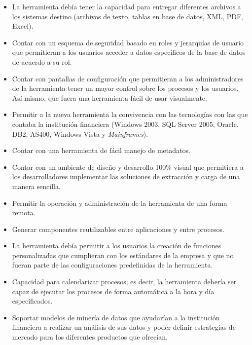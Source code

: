 \begin{itemize}
\item La herramienta debía tener la capacidad para entregar diferentes archivos
  a los sistemas destino (archivos de texto, tablas en base de datos, XML, PDF,
  Excel).

\item Contar con un esquema de seguridad basado en roles y jerarquías de usuario
  que permitieran a los usuarios acceder a datos específicos de la base de datos
  de acuerdo a su rol.

\item Contar con pantallas de configuración que permitieran a los
  administradores de la herramienta tener un mayor control sobre los procesos y
  los usuarios. Así mismo, que fuera una herramienta fácil de usar visualmente.

\item Permitir a la nueva herramienta la convivencia con las tecnologías con las
  que contaba la institución financiera (Windows 2003, SQL Server 2005, Oracle,
  DB2, AS400, Windows Vista y \emph{Mainframes}).

\item Contar con una herramienta de fácil manejo de metadatos.

\item Contar con un ambiente de diseño y desarrollo 100\% visual que permitiera
  a los desarrolladores implementar las soluciones de extracción y carga de una
  manera sencilla.

\item Permitir la operación y administración de la herramienta de una forma
  remota.

\item Generar componentes reutilizables entre aplicaciones y entre procesos.

\item La herramienta debía permitir a los usuarios la creación de funciones
  personalizadas que cumplieran con los estándares de la empresa y que no fueran
  parte de las configuraciones predefinidas de la herramienta.

\item Capacidad para calendarizar procesos; es decir, la herramienta debería ser
  capaz de ejecutar los procesos de forma automática a la hora y día
  especificados.

\item Soportar modelos de minería de datos que ayudarían a la institución
  financiera a realizar un análisis de sus datos y poder definir estrategias de
  mercado para los diferentes productos que ofrecían.


\end{itemize}
